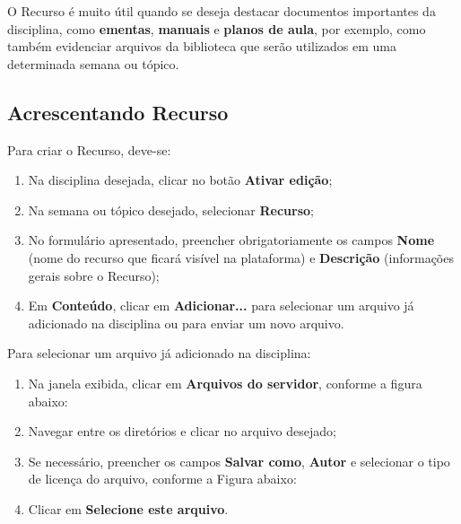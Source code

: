 O Recurso é muito útil quando se deseja destacar documentos importantes da disciplina, como\textbf{ ementas}, \textbf{manuais} e \textbf{planos de aula}, por exemplo, como também evidenciar arquivos da biblioteca que serão utilizados em uma determinada semana ou tópico.

\subsection{Acrescentando Recurso}
Para criar o Recurso, deve-se:

\begin{enumerate}
\item Na disciplina desejada, clicar no botão \textbf{Ativar edição};
\item Na semana ou tópico desejado, selecionar \textbf{Recurso};
\item No formulário apresentado, preencher obrigatoriamente os campos \textbf{Nome} (nome do recurso que ficará visível na plataforma) e \textbf{Descrição} (informações gerais sobre o Recurso);
\item Em \textbf{Conteúdo}, clicar em \textbf{Adicionar...} para selecionar um arquivo já adicionado na disciplina ou para enviar um novo arquivo.
\end{enumerate}

Para selecionar um arquivo já adicionado na disciplina:
\begin{enumerate}
\item Na janela exibida, clicar em \textbf{Arquivos do servidor}, conforme a figura abaixo:

         \begin{center}
         \end{center}

\item Navegar entre os diretórios e clicar no arquivo desejado;
\item Se necessário, preencher os campos \textbf{Salvar como}, \textbf{Autor} e selecionar o tipo de licença do arquivo, conforme a Figura abaixo:

         \begin{center}
         \end{center}

\item Clicar em \textbf{Selecione este arquivo}.
\end{enumerate}

